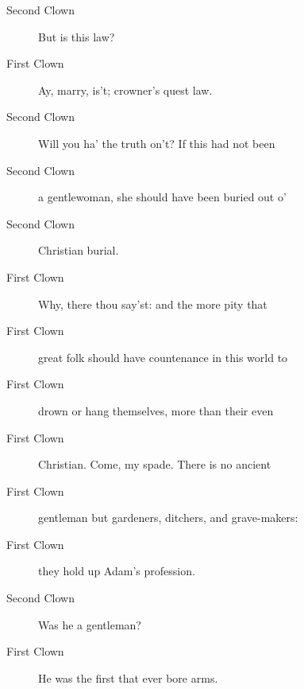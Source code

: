 \documentclass{article}
\begin{document}
\begin{description}
            
\item[Second Clown] But is this law?
\end{description}
          
\begin{description}
            
\item[First Clown] Ay, marry, is't; crowner's quest law.
\end{description}
          
\begin{description}
            
\item[Second Clown] Will you ha' the truth on't? If this had not been
\item[Second Clown] a gentlewoman, she should have been buried out o'
\item[Second Clown] Christian burial.
\end{description}
          
\begin{description}
            
\item[First Clown] Why, there thou say'st: and the more pity that
\item[First Clown] great folk should have countenance in this world to
\item[First Clown] drown or hang themselves, more than their even
\item[First Clown] Christian. Come, my spade. There is no ancient
\item[First Clown] gentleman but gardeners, ditchers, and grave-makers:
\item[First Clown] they hold up Adam's profession.
\end{description}
          
\begin{description}
            
\item[Second Clown] Was he a gentleman?
\end{description}
          
\begin{description}
            
\item[First Clown] He was the first that ever bore arms.
\end{description}
          
\end{document}
